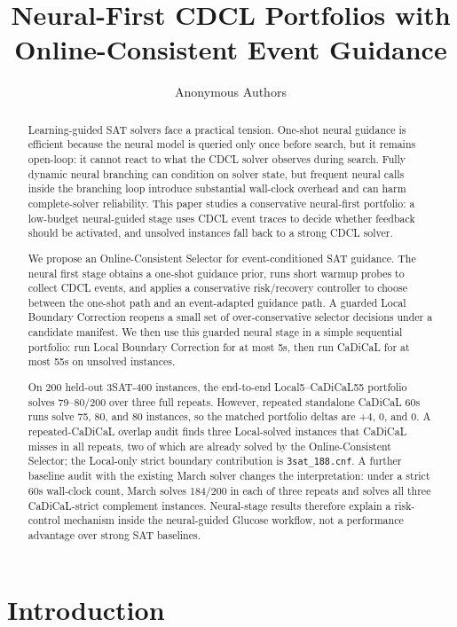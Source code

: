 \documentclass[11pt]{article}
\title{Neural-First CDCL Portfolios with Online-Consistent Event Guidance}
\author{Anonymous Authors}
\date{}
\begin{document}
\maketitle

\begin{abstract}
Learning-guided SAT solvers face a practical tension. One-shot neural guidance is efficient because the neural model is queried only once before search, but it remains open-loop: it cannot react to what the CDCL solver observes during search. Fully dynamic neural branching can condition on solver state, but frequent neural calls inside the branching loop introduce substantial wall-clock overhead and can harm complete-solver reliability. This paper studies a conservative neural-first portfolio: a low-budget neural-guided stage uses CDCL event traces to decide whether feedback should be activated, and unsolved instances fall back to a strong CDCL solver.

We propose an Online-Consistent Selector for event-conditioned SAT guidance. The neural first stage obtains a one-shot guidance prior, runs short warmup probes to collect CDCL events, and applies a conservative risk/recovery controller to choose between the one-shot path and an event-adapted guidance path. A guarded Local Boundary Correction reopens a small set of over-conservative selector decisions under a candidate manifest. We then use this guarded neural stage in a simple sequential portfolio: run Local Boundary Correction for at most 5s, then run CaDiCaL for at most 55s on unsolved instances.

On 200 held-out 3SAT-400 instances, the end-to-end Local5--CaDiCaL55 portfolio solves 79--80/200 over three full repeats. However, repeated standalone CaDiCaL 60s runs solve 75, 80, and 80 instances, so the matched portfolio deltas are +4, 0, and 0. A repeated-CaDiCaL overlap audit finds three Local-solved instances that CaDiCaL misses in all repeats, two of which are already solved by the Online-Consistent Selector; the Local-only strict boundary contribution is \texttt{3sat\_188.cnf}. A further baseline audit with the existing March solver changes the interpretation: under a strict 60s wall-clock count, March solves 184/200 in each of three repeats and solves all three CaDiCaL-strict complement instances. Neural-stage results therefore explain a risk-control mechanism inside the neural-guided Glucose workflow, not a performance advantage over strong SAT baselines.
\end{abstract}

\section{Introduction}
\end{document}
